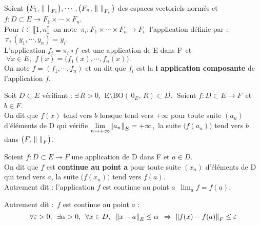 \vspace{1.3cm}

Soient \(\bigl(F_1,\, \norm{\ }_{F_1}\bigr),\cdots, \bigl(F_n,\, \norm{\ }_{F_n}\bigr)\) des espaces vectoriels normés et \(f:D\subset E \to F_1\times\cdots\times F_n\).\vspace{0.1cm}\\
Pour \(i\in \llbracket 1,n \rrbracket\,\) on note \(\,\pi_i : F_1\times\cdots\times F_n \to F_i\;\) l'application définie par : \(\,\pi_i\,(y_1,\cdots,y_n)=y_i\).\vspace{0.2cm}\\
L'application \(f_i=\pi_i\circ f\,\) est une application de E dans F\, et \(\;\forall x\in E,\ \,f(x)=\bigl(f_1(x),\cdots,f_n(x)\bigr).\)\vspace{0.1cm}\\
On note \(f=(f_1,\cdots,f_n)\) et on dit que $f_i$ est la \textbf{i application composante} de l'application $f$.

\vspace{1cm}

Soit $D\subset E$ vérifiant : \(\exists\, R>0,\ \, \text{E}\setminus\text{BO}(\,0_E,\,R)\subset D.\;\) Soient \(f:D\subset E\to F\, \) et $b\in F$.\vspace{0.1cm}\\
On dit que $f(x)$ tend vers $b$ lorsque  tend vers $+\infty$ \ssi pour toute suite $(a_n)$ d'éléments de D qui vérifie \(\displaystyle \lim_{n\to +\infty}\! \left\lVert a_n\right\rVert_E=+\infty\),\, la suite \( \bigl( f(a_n) \bigr) \) tend vers $b$ dans \(\bigl(F,\, \norm{\ }_F\bigr)\).

\vspace{1cm}

Soient \(f:D\subset E\to F\) une application de D dans F et \underline{\(a\in D\)}.\vspace{0.1cm}\\
On dit que $f$ est \textbf{continue au point a} \ssi pour toute suite \((x_n)\) d'éléments de D qui tend vers $a$, la suite \(\bigl(f(x_n)\bigr)\) tend vers $f(a)$.\vspace{0.1cm}\\
Autrement dit : l'application $f$ est continue au point $a$ \ssi \(\,\displaystyle \lim_af=f(a).\)

\vspace{0.1cm}

Autrement dit : \(\,f\) est continue au point $a$ \ssi :\vspace{-0.25cm}
\[\forall \varepsilon >0,\ \, \exists \alpha >0,\ \, \forall x\in D,\ \; \left\lVert x-a\right\rVert_E \leq \alpha \ \, \Rightarrow \ \left\lVert f(x)-f(a)\right\rVert_F\leq \varepsilon\]

